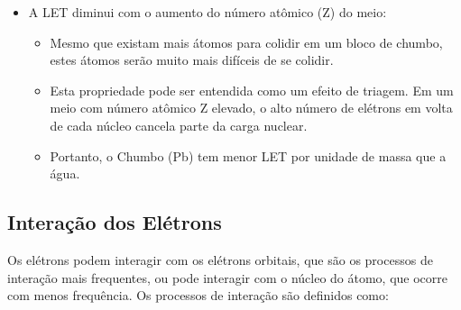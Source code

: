 \documentclass[11pt,a4paper]{article}
\begin{document}
\begin{itemize}
                \item A LET diminui com o aumento do número atômico (Z) do meio:
                    
                    \begin{itemize}
                        \item Mesmo que existam mais átomos para colidir em um bloco de chumbo, estes átomos serão muito mais difíceis de se colidir. 
                            
                        \item Esta propriedade pode ser entendida como um efeito de triagem. Em um meio com número atômico Z elevado, o alto número de elétrons em volta de cada núcleo cancela parte da carga nuclear. 
                            
                        \item Portanto, o Chumbo (Pb) tem menor LET por unidade de massa que a água. 
                    \end{itemize}
            \end{itemize}
                
        \subsection{Interação dos Elétrons}


            Os elétrons podem interagir com os elétrons orbitais, que são os processos de interação mais frequentes, ou pode interagir com o núcleo do átomo, que ocorre com menos frequência. Os processos de interação são definidos como:
\end{document}
